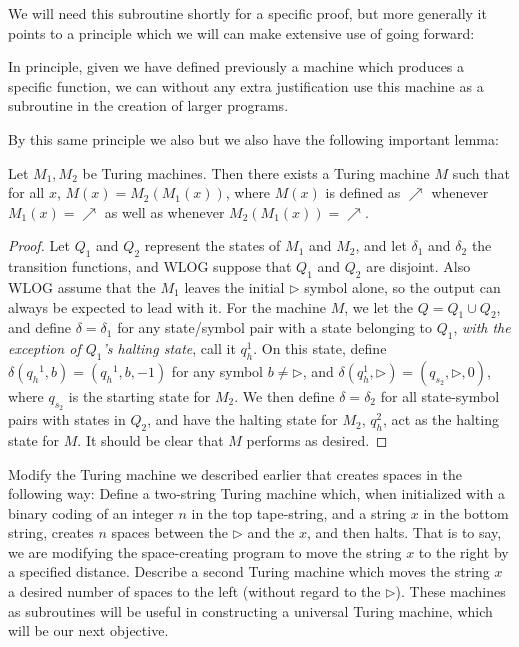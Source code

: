 We will need this subroutine shortly for a specific proof, but more generally it points to a principle which we will can make extensive use of going forward:
\begin{center}
	In principle, given we have defined previously a machine which produces a specific function, we can without any extra justification use this machine as a subroutine in the creation of larger programs. 
\end{center}
	By this same principle we also but we also have the following important lemma:
\begin{lemma}
    Let $M_1,M_2$ be Turing machines. Then there exists a Turing machine $M$ such that for all $x$, $M(x) = M_2(M_1(x))$, where $M(x)$ is defined as $\nearrow$ whenever $M_1(x) = \nearrow$ as well as whenever $M_2(M_1(x)) = \nearrow$. 
\end{lemma}
\begin{proof}
    Let $Q_1$ and $Q_2$ represent the states of $M_1$ and $M_2$, and let $\delta_1$ and $\delta_2$ the transition functions, and WLOG suppose that $Q_1$ and $Q_2$ are disjoint. 
    Also WLOG assume that the $M_1$ leaves the initial $\triangleright$ symbol alone, so the output can always be expected to lead with it. For the machine $M$, we let the $Q=Q_1 \cup Q_2$, and define $\delta = \delta_1$ for any state/symbol pair with a state belonging to $Q_1$, \textit{with the exception of $Q_1$'s halting state}, call it $q_h^1$. 
    On this state, define $\delta({q_h}^1,b) = ({q_h}^1,b,-1)$ for any symbol $b \neq \triangleright$, and $\delta(q_h^1,\triangleright)=(q_{s_2},\triangleright,0)$, where $q_{s_2}$ is the starting state for $M_2$. We then define $\delta = \delta_2$ for all state-symbol pairs with states in $Q_2$, and have the halting state for $M_2$, $q_h^2$, act as the halting state for $M$. It should be clear that $M$ performs as desired. 
\end{proof}
\begin{exercise}
	Modify the Turing machine we described earlier that creates spaces in the following way: Define a two-string Turing machine which, when initialized with a binary coding of an integer $n$ in the top tape-string, and a string $x$ in the bottom string, creates $n$ spaces between the $\triangleright$ and the $x$, and then halts. That is to say, we are modifying the space-creating program to move the string $x$ to the right by a specified distance. Describe a second Turing machine which moves the string $x$ a desired number of spaces to the left (without regard to the $\triangleright$). These machines as subroutines will be useful in constructing a universal Turing machine, which will be our next objective. 
\end{exercise}

